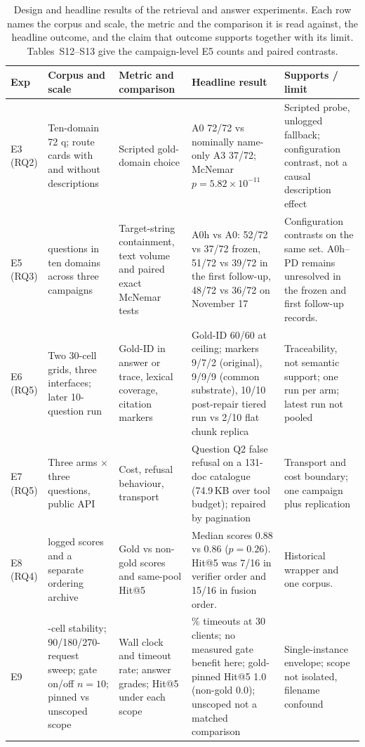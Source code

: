 \documentclass[final,5p,times,twocolumn]{elsarticle}
\begin{document}
\begin{table}[t]
\centering
\footnotesize
\setlength{\tabcolsep}{4pt}
\caption{Design and headline results of the retrieval and answer experiments.
Each row names the corpus and scale, the metric and the comparison it is read
against, the headline outcome, and the claim that outcome supports together
with its limit. Tables~S12--S13 give the campaign-level E5 counts and paired
contrasts.}
\label{tab:retrieval-design}
\begin{tabular}{@{}>{\raggedright\arraybackslash}p{}>{\raggedright\arraybackslash}p{}>{\raggedright\arraybackslash}p{}>{\raggedright\arraybackslash}p{}>{\raggedright\arraybackslash}p{}@{}}
\toprule
Exp & Corpus and scale & Metric and comparison & Headline result & Supports / limit\\
\midrule
E3 (RQ2) & Ten-domain 72 q; route cards with and without descriptions & Scripted gold-domain choice & A0 72/72 vs nominally name-only A3 37/72; McNemar $p=5.82\times10^{-11}$ & Scripted probe, unlogged fallback; configuration contrast, not a causal description effect\\
E5 (RQ3) & 72 questions in ten domains across three campaigns & Target-string containment, text volume and paired exact McNemar tests & A0h vs A0: 52/72 vs 37/72 frozen, 51/72 vs 39/72 in the first follow-up, 48/72 vs 36/72 on November 17 & Configuration contrasts on the same set. A0h--PD remains unresolved in the frozen and first follow-up records.\\
E6 (RQ5) & Two 30-cell grids, three interfaces; later 10-question run & Gold-ID in answer or trace, lexical coverage, citation markers & Gold-ID 60/60 at ceiling; markers 9/7/2 (original), 9/9/9 (common substrate), 10/10 post-repair tiered run vs 2/10 flat chunk replica & Traceability, not semantic support; one run per arm; latest run not pooled\\
E7 (RQ5) & Three arms $\times$ three questions, public API & Cost, refusal behaviour, transport & Question Q2 false refusal on a 131-doc catalogue (74.9\,KB over tool budget); repaired by pagination & Transport and cost boundary; one campaign plus replication\\
E8 (RQ4) & 191 logged scores and a separate ordering archive & Gold vs non-gold scores and same-pool Hit@5 & Median scores 0.88 vs 0.86 ($p=0.26$). Hit@5 was 7/16 in verifier order and 15/16 in fusion order. & Historical wrapper and one corpus.\\
E9 & 27-cell stability; 90/180/270-request sweep; gate on/off $n=10$; pinned vs unscoped scope & Wall clock and timeout rate; answer grades; Hit@5 under each scope & 41\% timeouts at 30 clients; no measured gate benefit here; gold-pinned Hit@5 1.0 (non-gold 0.0); unscoped not a matched comparison & Single-instance envelope; scope not isolated, filename confound\\
\bottomrule
\end{tabular}
\end{table}
\end{document}
